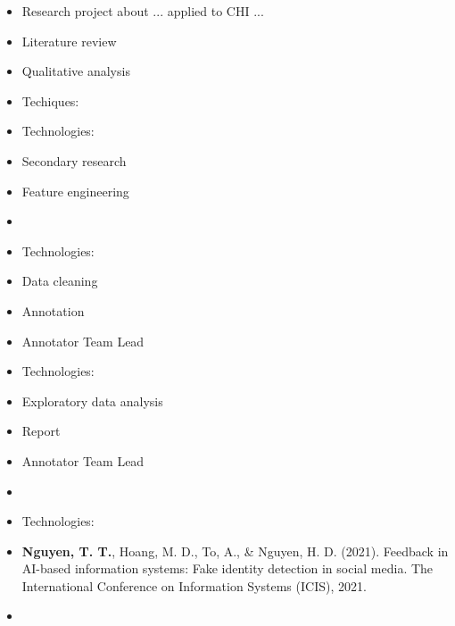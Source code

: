 \documentclass[10pt,a4paper,ragged2e]{altacv}
\begin{document}
\begin{paracol}{2}


\begin{itemize}
	\item Research project about ... applied to CHI ...
	\item Literature review
	\item Qualitative analysis
	\subitem 
	\subitem 
	\item Techiques:
	\item Technologies:
\end{itemize}

\begin{itemize}
	\item Secondary research
	\item Feature engineering
	\item 
	\subitem 
	\subitem 
	\item Technologies:
\end{itemize}

\begin{itemize}
	\item Data cleaning
	\item Annotation
	\item Annotator Team Lead
	\subitem 
	\subitem 
	\item Technologies: 
\end{itemize}

\begin{itemize}
	\item Exploratory data analysis
	\item Report
	\item Annotator Team Lead
	\item 
	\subitem 
	\subitem 
	\item Technologies: 
\end{itemize}

\switchcolumn


\begin{itemize}
	\item \textbf{Nguyen, T. T.}, Hoang, M. D., To, A., \& Nguyen, H. D. (2021). Feedback in AI-based information systems: Fake identity detection in social media. The International Conference on Information Systems (ICIS), 2021.
	\item 
\end{itemize}


\end{paracol}
\end{document}

